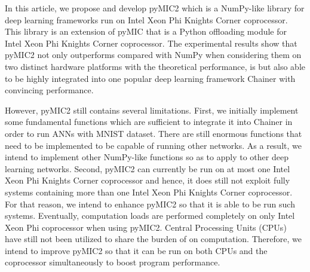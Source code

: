 In this article, we propose and develop pyMIC2 which is a NumPy-like library for deep learning frameworks run on Intel Xeon Phi Knights Corner coprocessor. This library is an extension of pyMIC that is a Python offloading module for Intel Xeon Phi Knights Corner coprocessor. The experimental results show that pyMIC2 not only outperforms compared with NumPy when considering them on two distinct hardware platforms with the theoretical performance, is but also able to be highly integrated into one popular deep learning framework Chainer with convincing performance. 

However, pyMIC2 still contains several limitations. First, we initially implement some fundamental functions which are sufficient to integrate it into Chainer in order to run ANNs with MNIST dataset. There are still enormous functions that need to be implemented to be capable of running other networks. As a result, we intend to implement other NumPy-like functions so as to apply to other deep learning networks. Second, pyMIC2 can currently be run on at most one Intel Xeon Phi Knights Corner coprocessor and hence, it does still not exploit fully systems containing more than one Intel Xeon Phi Knights Corner coprocessor. For that reason, we intend to enhance pyMIC2 so that it is able to be run such systems. Eventually, computation loads are performed completely on only Intel Xeon Phi coprocessor when using pyMIC2. Central Processing Units (CPUs) have still not been utilized to share the burden of on computation. Therefore, we intend to improve pyMIC2 so that it can be run on both CPUs and the coprocessor simultaneously to boost program performance. 
